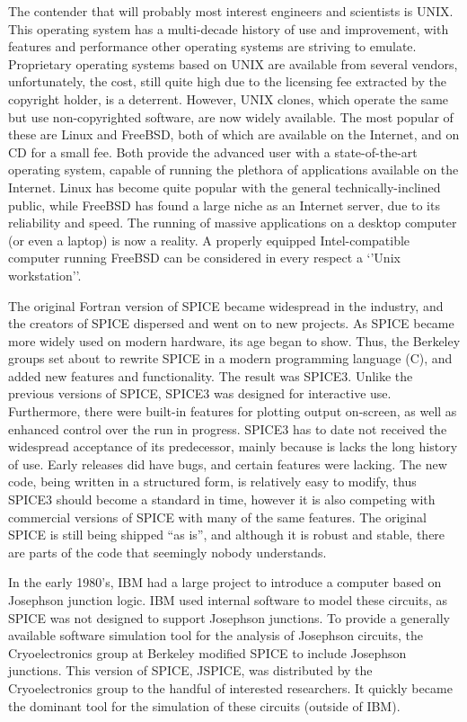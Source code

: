 The contender that will probably most interest engineers and
scientists is UNIX.  This operating system has a multi-decade history
of use and improvement, with features and performance other operating
systems are striving to emulate.  Proprietary operating systems based
on UNIX are available from several vendors, unfortunately, the cost,
still quite high due to the licensing fee extracted by the copyright
holder, is a deterrent.  However, UNIX clones, which operate the same
but use non-copyrighted software, are now widely available.  The most
popular of these are Linux and FreeBSD, both of which are available on
the Internet, and on CD for a small fee.  Both provide the advanced
user with a state-of-the-art operating system, capable of running the
plethora of applications available on the Internet.  Linux has become
quite popular with the general technically-inclined public, while
FreeBSD has found a large niche as an Internet server, due to its
reliability and speed.  The running of massive applications on a
desktop computer (or even a laptop) is now a reality.  A properly
equipped Intel-compatible computer running FreeBSD can be considered
in every respect a `'Unix workstation''.

The original Fortran version of SPICE became widespread in the
industry, and the creators of SPICE dispersed and went on to new
projects.  As SPICE became more widely used on modern hardware, its
age began to show.  Thus, the Berkeley groups set about to rewrite
SPICE in a modern programming language (C), and added new features and
functionality.  The result was SPICE3.  Unlike the previous versions
of SPICE, SPICE3 was designed for interactive use.  Furthermore, there
were built-in features for plotting output on-screen, as well as
enhanced control over the run in progress. SPICE3 has to date not
received the widespread acceptance of its predecessor, mainly because
is lacks the long history of use.  Early releases did have bugs, and
certain features were lacking.  The new code, being written in a
structured form, is relatively easy to modify, thus SPICE3 should
become a standard in time, however it is also competing with
commercial versions of SPICE with many of the same features.  The
original SPICE is still being shipped ``as is'', and although it is
robust and stable, there are parts of the code that seemingly nobody
understands.

In the early 1980's, IBM had a large project to introduce a computer
based on Josephson junction logic.  IBM used internal software to
model these circuits, as SPICE was not designed to support Josephson
junctions.  To provide a generally available software simulation tool
for the analysis of Josephson circuits, the Cryoelectronics group at
Berkeley modified SPICE to include Josephson junctions.  This version
of SPICE, JSPICE, was distributed by the Cryoelectronics group to the
handful of interested researchers.  It quickly became the dominant
tool for the simulation of these circuits (outside of IBM).

